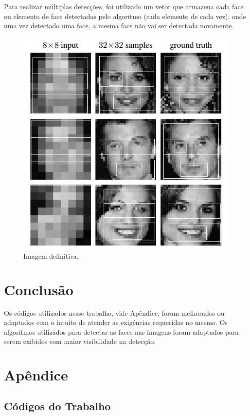 \documentclass{article}
\begin{document}
	Para realizar múltiplas detecções, foi utilizado um vetor que armazena cada face ou elemento de face detectadas pelo algoritmo (cada elemento de cada vez), onde uma vez detectado uma face, a mesma face não vai ser detectada novamente.
	\begin{figure}
		\centering
		\includegraphics[scale = 0.4]{ft5.jpg}
		\caption{Imagem definitiva.}
	\end{figure}
	
	\newpage
	\section{Conclusão}
	Os códigos utilizados nesse trabalho, vide Apêndice, foram melhorados ou adaptados com o intuito de atender as exigências requeridas no mesmo. Os algorítmos utilizados para detectar as faces nas imagens foram adaptados para serem exibidos com maior visibilidade na detecção.
	\newpage
	\section{Apêndice}
	\subsection{Códigos do Trabalho}
\end{document}
